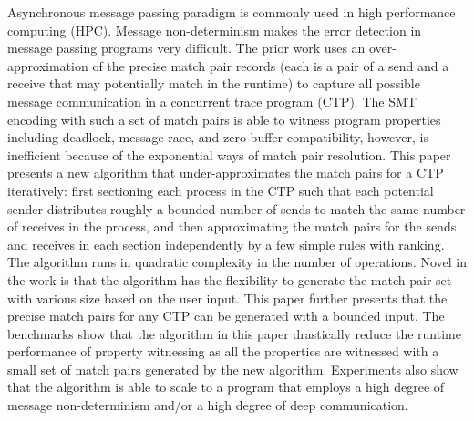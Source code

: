 Asynchronous message passing paradigm is commonly used in high performance computing (HPC).
Message non-determinism makes the error detection in message passing programs very difficult. The prior work uses an over-approximation of the precise match pair records (each is a pair of a send and a receive that may potentially match in the runtime) to capture all possible message communication in a concurrent trace program (CTP). The SMT encoding with such a set of match pairs is able to witness program properties including deadlock, message race, and zero-buffer compatibility, however, is inefficient because of the exponential ways of match pair resolution.
This paper presents a new algorithm that under-approximates the match pairs for a CTP iteratively: first sectioning each process in the CTP such that each potential sender distributes roughly a bounded number of sends to match the same number of receives in the process, and then approximating the match pairs for the sends and receives in each section independently by a few simple rules with ranking. The algorithm runs in quadratic complexity in the number of operations. Novel in the work is that the algorithm has the flexibility to generate the match pair set with various size based on the user input. This paper further presents that the precise match pairs for any CTP can be generated with a bounded input. The benchmarks show that the algorithm in this paper drastically reduce the runtime performance of property witnessing as all the properties are witnessed with a small set of match pairs generated by the new algorithm. Experiments also show that the algorithm is able to scale to a program that employs a high degree of message non-determinism and/or a high degree of deep communication.